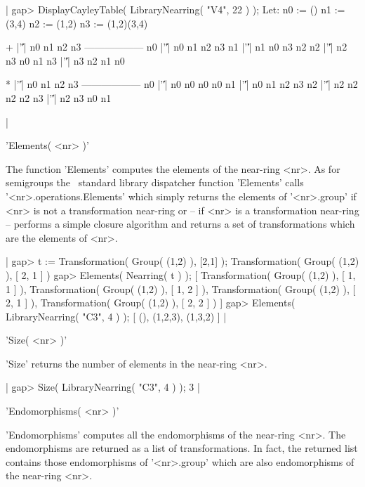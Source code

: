 |  gap> DisplayCayleyTable( LibraryNearring( "V4", 22 ) );
  Let:
  n0 := ()
  n1 := (3,4)
  n2 := (1,2)
  n3 := (1,2)(3,4)

    +  |'\|'| n0 n1 n2 n3 
   ------------------
    n0 |'\|'| n0 n1 n2 n3 
    n1 |'\|'| n1 n0 n3 n2 
    n2 |'\|'| n2 n3 n0 n1 
    n3 |'\|'| n3 n2 n1 n0 

    *  |'\|'| n0 n1 n2 n3 
   ------------------
    n0 |'\|'| n0 n0 n0 n0 
    n1 |'\|'| n0 n1 n2 n3 
    n2 |'\|'| n2 n2 n2 n2 
    n3 |'\|'| n2 n3 n0 n1 

|

   
'Elements( <nr> )'  

The function 'Elements' computes the elements of the near-ring <nr>. 
As for semigroups the 
\GAP\ standard library dispatcher function 'Elements' calls 
'<nr>.op\-er\-a\-tions.El\-e\-ments' which
simply returns the elements of '<nr>.\-group' if <nr> is not a 
transformation near-ring or -- if <nr> is a transformation near-ring -- 
performs a simple closure algorithm and returns a set of transformations
which are the elements of <nr>.

|  gap> t := Transformation( Group( (1,2) ), [2,1] );
  Transformation( Group( (1,2) ), [ 2, 1 ] )
  gap> Elements( Nearring( t ) );
  [ Transformation( Group( (1,2) ), [ 1, 1 ] ), 
    Transformation( Group( (1,2) ), [ 1, 2 ] ), 
    Transformation( Group( (1,2) ), [ 2, 1 ] ), 
    Transformation( Group( (1,2) ), [ 2, 2 ] ) ]
  gap> Elements( LibraryNearring( "C3", 4 ) );
  [ (), (1,2,3), (1,3,2) ]
|

   
'Size( <nr> )'  

'Size' returns the number of elements in the near-ring <nr>.

|  gap> Size( LibraryNearring( "C3", 4 ) );
  3
|

   
'Endomorphisms( <nr> )'  

'Endomorphisms' computes all the endomorphisms of the near-ring <nr>. 
The endomorphisms are returned as a list of transformations. In fact, the
returned list contains those endomorphisms of '<nr>.group' which are 
also endomorphisms of the near-ring <nr>.

